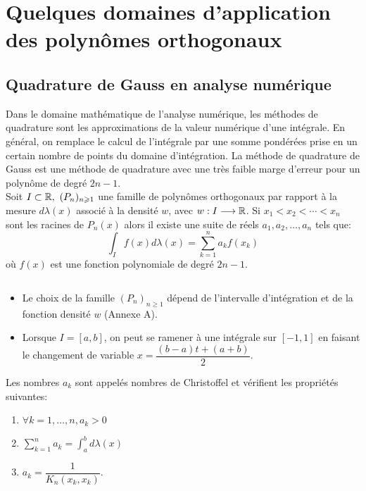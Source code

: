 \chapter{Quelques domaines d'application des polynômes orthogonaux}

\section{Quadrature de Gauss en analyse numérique}
Dans le domaine mathématique de l'analyse numérique, les méthodes de quadrature sont les approximations de la valeur numérique d'une intégrale. En général, on remplace le calcul de l'intégrale par une somme pondérées prise en un certain nombre de points du domaine d'intégration. La méthode de quadrature de Gauss est une méthode de quadrature avec une très faible marge d'erreur pour un polynôme de degré $2n-1$.
\bthm
$ $\\
Soit $I\subset\mathbb R, \ (P_n)_{n\geqslant 1}$ une famille de polynômes orthogonaux par rapport à la mesure $d\lambda(x)$ associé à la densité $w$, avec $w:I\longrightarrow \mathbb R$. Si $x_1< x_2< \cdots < x_n$ sont les racines de $P_n(x)$ alors il existe une suite de réels $a_1,a_2, \dots ,a_n$ tels que: $$\int_I{f(x)d\lambda(x)}=\sum\limits_{k=1}^n a_k f(x_k)$$ où $f(x)$ est une fonction polynomiale de degré $2n-1$.
\ethm

\brmq
$ $
\begin{itemize}
\item Le choix de la famille $(P_n)_{n \geq 1}$ dépend de l'intervalle d'intégration et de la fonction densité $w$ (Annexe A).
\item Lorsque $I=[a,b]$, on peut se ramener à une intégrale sur $[-1,1]$ en faisant le changement de variable $x=\dfrac{(b-a)t+(a+b)}{2}$.
\end{itemize}
\ermq

\bprop
$ $\\
Les nombres $a_k$ sont appelés nombres de Christoffel et vérifient les propriétés suivantes:
\begin{enumerate}
\item $\forall k=1,\dots,n, a_k > 0$
\item $\displaystyle{\sum\limits_{k=1}^n a_k = \int_a^b{d\lambda(x)}}$
\item $a_k=\dfrac{1}{K_n(x_k,x_k)}$.
\end{enumerate}
\eprop

